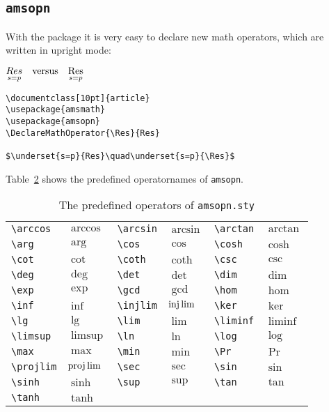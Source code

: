 \begin{table}[htb]
\subsection{\texttt{amsopn}}\label{sec:amsopn}
With the  package it is very easy to declare new math operators, which are written in
upright mode:

$\underset{s=p}{Res}\quad\text{versus}\quad\underset{s=p}{\Res}$

\medskip
\begin{lstlisting}
\documentclass[10pt]{article}
\usepackage{amsmath}
\usepackage{amsopn}
\DeclareMathOperator{\Res}{Res}

$\underset{s=p}{Res}\quad\underset{s=p}{\Res}$

\end{lstlisting}

Table~\ref{tab:amsopn} shows the predefined operatornames of \verb+amsopn+.

\begin{table}[htb]
\centering
\begin{tabular}{llllll}
\verb+\arccos+ & $\arccos$ & \verb+\arcsin+ & $\arcsin$ & \verb+\arctan+ & $\arctan$\\
\verb+\arg+    & $\arg$    & \verb+\cos+    & $\cos$    & \verb+\cosh+   & $\cosh$\\
\verb+\cot+    & $\cot$    & \verb+\coth+   & $\coth$   & \verb+\csc+    & $\csc$\\
\verb+\deg+    & $\deg$    & \verb+\det+    & $\det$    & \verb+\dim+    & $\dim$\\
\verb+\exp+    & $\exp$    & \verb+\gcd+    & $\gcd$    & \verb+\hom+    & $\hom$\\
\verb+\inf+    & $\inf$    & \verb+\injlim+ & $\injlim$ & \verb+\ker+    & $\ker$\\
\verb+\lg+     & $\lg$     & \verb+\lim+    & $\lim$    & \verb+\liminf+ & $\liminf$\\
\verb+\limsup+ & $\limsup$ & \verb+\ln+     & $\ln$     & \verb+\log+    & $\log$\\
\verb+\max+    & $\max$    & \verb+\min+    & $\min$    & \verb+\Pr+     & $\Pr$\\
\verb+\projlim+& $\projlim$& \verb+\sec+    & $\sec$    & \verb+\sin+    & $\sin$\\
\verb+\sinh+   & $\sinh$   & \verb+\sup+    & $\sup$    & \verb+\tan+    & $\tan$\\
\verb+\tanh+   & $\tanh$
\end{tabular}
\caption{The predefined operators of \texttt{amsopn.sty}}\label{tab:amsopn}
\end{table}



\end{table}
